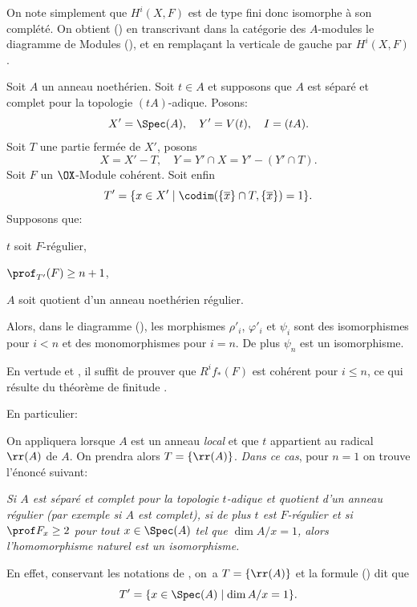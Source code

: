 On note simplement que $H^i(X, F)$ est de type fini donc isomorphe
\`a son compl\'et\'e. On obtient () en transcrivant dans
la cat\'egorie des $A$-modules le diagramme de Modules
(), et en rempla\c cant la verticale de gauche par
$H^i(X, F)$.

\begin{proposition}\setcounter {equation}{30} \label{IX.1.4}
Soit $A$ un anneau noeth\'erien. Soit $t\in A$ et supposons que $A$ est s\'epar\'e et complet pour la topologie $(tA)$-adique. Posons:
\begin{equation} \label{eq:IX.1.31}
X'=\Spec (A), \quad Y'=V(t), \quad I=(tA).
\end{equation}
Soit $T$ une partie ferm\'ee de $X'$, posons
\begin{equation} \label{eq:IX.1.32}
X=X'-T, \quad Y=Y'\cap X=Y'-(Y'\cap T).
\end{equation}
Soit $F$ un $\OX$-Module coh\'erent. Soit enfin
\begin{equation} \label{eq:IX.1.33}
T'= \{ x\in X' \mid \codim(\{ \overline{x}\} \cap T, \{\overline{x}\})=1\}.
\end{equation}
Supposons que:
\begin{enumeratea}
\item
$t$ soit $F$-r\'egulier,
\item
$\prof_{T'}(F) \geq n+1$,
\item
$A$ soit quotient d'un anneau noeth\'erien r\'egulier.
\end{enumeratea}
\noindent
Alors, dans le diagramme (), les morphismes $\rho'_i$, $\varphi'_i$ et $\psi_i$ sont des isomorphismes pour $i<n$ et des monomorphismes pour $i=n$. De plus $\psi_n$ est un isomorphisme.
\end{proposition}

En vertu\pageoriginale de  et , il suffit de prouver que $R^if_*(F)$ est coh\'erent pour $i\leq n$, ce qui r\'esulte du th\'eor\`eme de finitude .

En particulier:

\begin{exemple} \label{IX.1.5} On appliquera  lorsque $A$ est un anneau \emph{local} et que $t$ appartient au radical $\rr(A)$ de $A$. On prendra alors $T=\{ \rr(A)\}$. \emph{Dans ce cas}, pour $n=1$ on trouve l'\'enonc\'e suivant:

\emph{Si $A$  est s\'epar\'e et complet pour la topologie $t$-adique et quotient d'un anneau r\'egulier (par exemple si $A$ est complet), si de plus $t$ est $F$-r\'egulier et si $\prof F_x\geq 2$ pour tout $x\in \Spec (A)$ tel que $\dim A/x=1$, alors l'homomorphisme naturel  est un isomorphisme.}

En effet, conservant les notations de , on~a $T=\{ \rr(A)\}$ et la formule () dit que
$$
T'=\{x\in\Spec(A)\mid\dim A/x=1\}.
$$
\end{exemple}

